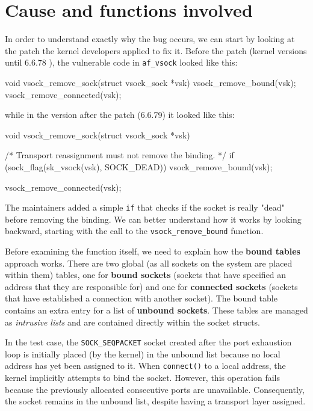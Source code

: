 \section{Cause and functions involved}\label{functions_involved}

In order to understand exactly why the bug occurs, we can start by looking at the patch \cite{bib:kernel-patch} the kernel developers applied to fix it. Before the patch (kernel versions until 6.6.78 \cite{bib:af-vsock-code}), the vulnerable code in \texttt{af\_vsock} looked like this:

\begin{clncode}
    void vsock_remove_sock(struct vsock_sock *vsk)
    {
        vsock_remove_bound(vsk);
        vsock_remove_connected(vsk);
    }
\end{clncode}

\noindent while in the version after the patch (6.6.79) it looked like this:

\begin{clncode}[highlightlines=4]
    void vsock_remove_sock(struct vsock_sock *vsk)
    {
    	/* Transport reassignment must not remove the binding. */
    	if (sock_flag(sk_vsock(vsk), SOCK_DEAD))
    		vsock_remove_bound(vsk);
    
    	vsock_remove_connected(vsk);
    }
\end{clncode}

\noindent The maintainers added a simple \texttt{if} that checks if the socket is really "dead" before removing the binding. We can better understand how it works by looking backward, starting with the call to the \texttt{vsock\_remove\_bound} \cite{bib:af-vsock-code} function.

Before examining the function itself, we need to explain how the \textbf{bound tables} approach works. There are two global (as all sockets on the system are placed within them) tables, one for \textbf{bound sockets} (sockets that have specified an address that they are responsible for) and one for \textbf{connected sockets} (sockets that have established a connection with another socket). The bound table contains an extra entry for a list of \textbf{unbound sockets}. These tables are managed as \textit{intrusive lists} and are contained directly within the socket structs.

In the test case, the \texttt{SOCK\_SEQPACKET} socket created after the port exhaustion loop is initially placed (by the kernel) in the unbound list because no local address has yet been assigned to it. When \texttt{connect()} to a local address, the kernel implicitly attempts to bind the socket. However, this operation fails because the previously allocated consecutive ports are unavailable. Consequently, the socket remains in the unbound list, despite having a transport layer assigned.

